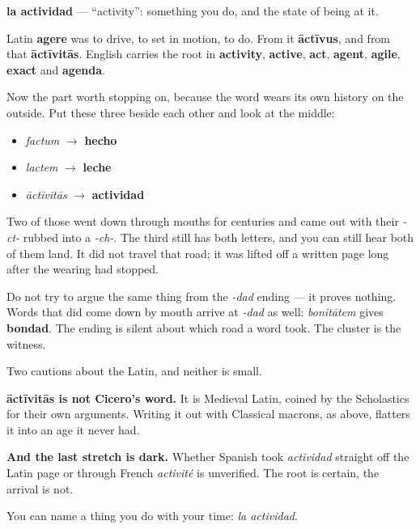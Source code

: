\begin{cousinweb}
\textbf{la actividad} — \textquotedblleft{}activity\textquotedblright{}: something you do, and the state of being at it.

Latin \textbf{agere} was to drive, to set in motion, to do. From it \textbf{āctīvus}, and from that \textbf{āctīvitās}. English carries the root in \textbf{activity}, \textbf{active}, \textbf{act}, \textbf{agent}, \textbf{agile}, \textbf{exact} and \textbf{agenda}.

Now the part worth stopping on, because the word wears its own history on the outside. Put these three beside each other and look at the middle:

\begin{itemize}
\raggedright
  \item \emph{factum} $\to$ \textbf{hecho}
  \item \emph{lactem} $\to$ \textbf{leche}
  \item \emph{āctīvitās} $\to$ \textbf{actividad}
\end{itemize}

Two of those went down through mouths for centuries and came out with their \emph{-ct-} rubbed into a \emph{-ch-}. The third still has both letters, and you can still hear both of them land. It did not travel that road; it was lifted off a written page long after the wearing had stopped.

Do not try to argue the same thing from the \emph{-dad} ending — it proves nothing. Words that did come down by mouth arrive at \emph{-dad} as well: \emph{bonitātem} gives \textbf{bondad}. The ending is silent about which road a word took. The cluster is the witness.

Two cautions about the Latin, and neither is small.

\textbf{āctīvitās is not Cicero's word.} It is Medieval Latin, coined by the Scholastics for their own arguments. Writing it out with Classical macrons, as above, flatters it into an age it never had.

\textbf{And the last stretch is dark.} Whether Spanish took \emph{actividad} straight off the Latin page or through French \emph{activité} is unverified. The root is certain, the arrival is not.
\end{cousinweb}

\begin{grammarlens}[title={What you've built}]
You can name a thing you do with your time: \emph{la actividad}.
\end{grammarlens}

